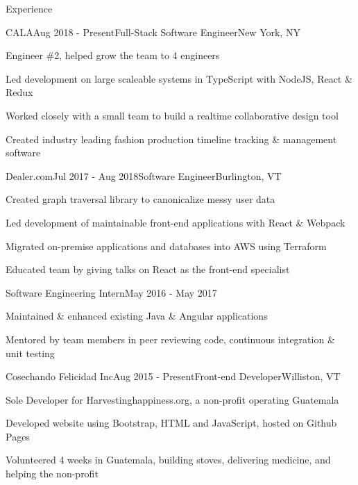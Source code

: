 \documentclass{resume} %
\begin{document}

\begin{rSection}{Experience}


\begin{rSubsection}{CALA}{Aug 2018 - Present}{Full-Stack Software Engineer}{New York, NY}
    \item Engineer \#2, helped grow the team to 4 engineers
    \item Led development on large scaleable systems in TypeScript with NodeJS, React \& Redux
    \item Worked closely with a small team to build a realtime collaborative design tool
    \item Created industry leading fashion production timeline tracking \& management software
\end{rSubsection}


\begin{rSubsection}{Dealer.com}{Jul 2017 - Aug 2018}{Software Engineer}{Burlington, VT}
    \item Created graph traversal library to canonicalize messy user data
    \item Led development of maintainable front-end applications with React \& Webpack
    \item Migrated on-premise applications and databases into AWS using Terraform
    \item Educated team by giving talks on React as the front-end specialist
\end{rSubsection}

\begin{sSubsection}{Software Engineering Intern}{May 2016 - May 2017}
    \item Maintained \& enhanced existing Java \& Angular applications
    \item Mentored by team members in peer reviewing code, continuous integration \& unit testing
\end{sSubsection}


\begin{rSubsection}{Cosechando Felicidad Inc}{Aug 2015 - Present}{Front-end Developer}{Williston, VT}
    \item Sole Developer for Harvestinghappiness.org, a non-profit operating Guatemala
    \item Developed website using Bootstrap, HTML and JavaScript, hosted on Github Pages
    \item Volunteered 4 weeks in Guatemala, building stoves, delivering medicine, and helping the non-profit
\end{rSubsection}


\end{rSection}
\end{document}
